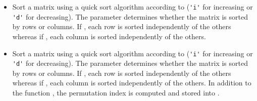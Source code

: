 \begin{itemize}
\item {}
  \sshortdescribe Sort a matrix using a quick sort algorithm according to
   (\verb!'i'! for increasing or \verb!'d'! for decreasing). The parameter  determines
  whether the matrix is sorted by rows or columns. If , each row
  is sorted independently of the others whereas if , each column
  is sorted independently of the others.

\item {}
  \sshortdescribe Sort a matrix using a quick sort algorithm according to
   (\verb!'i'! for increasing or \verb!'d'! for decreasing). The
  parameter  determines whether the matrix is sorted by rows or
  columns. If , each row is sorted independently of the others
  whereas if , each column is sorted independently of the
  others. In addition to the function , the permutation
  index is computed and stored into .


\end{itemize}
